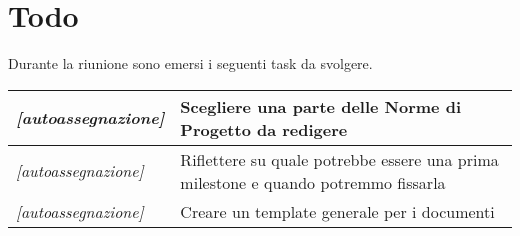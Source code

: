 \section{Todo}
Durante la riunione sono emersi i seguenti task da svolgere.

\begin{center}
  \begin{tabular}{|p{5cm}|p{7cm}|}
    \hline
    \textit{[autoassegnazione]} & Scegliere una parte delle Norme di Progetto da redigere  \\ \hline
    \textit{[autoassegnazione]} & Riflettere su quale potrebbe essere una prima milestone e quando potremmo fissarla  \\ \hline
    \textit{[autoassegnazione]} & Creare un template generale per i documenti  \\ \hline
  \end{tabular}
\end{center}
